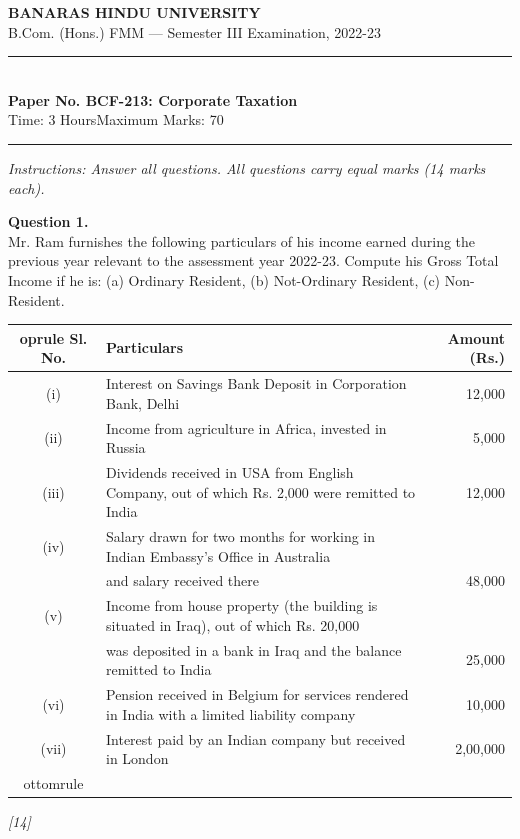 \documentclass[11pt,a4paper]{article}
\newcommand{\pts}[1]{\hfill   \textit{[#1]}}
\begin{document}
\begin{center}
  {\large\bfseries BANARAS HINDU UNIVERSITY}\\[2pt]
  {\normalsize B.Com. (Hons.) FMM --- Semester III Examination, 2022-23}\\[6pt]
  \rule{0.8\linewidth}{0.5pt}\\[6pt]
  {\large\bfseries Paper No. BCF-213: Corporate Taxation}\\[4pt]
  {\normalsize Time: 3 Hours\hfill Maximum Marks: 70}
\end{center}

\rule{\linewidth}{0.4pt}

\smallskip



\noindent   \textit{Instructions: Answer all questions. All questions carry equal marks (14 marks each).}

\bigskip




\noindent   \textbf{Question 1.} \\
Mr. Ram furnishes the following particulars of his income earned during the previous year relevant to the assessment year 2022-23. Compute his Gross Total Income if he is: (a) Ordinary Resident, (b) Not-Ordinary Resident, (c) Non-Resident.


\begin{table}[h!]
  \centering
  \small
  
\begin{tabular}{clr}
     oprule
   \textbf{Sl. No.} &   \textbf{Particulars} &   \textbf{Amount (Rs.)} \\
    \midrule
    (i)   & Interest on Savings Bank Deposit in Corporation Bank, Delhi & 12,000 \\
    (ii)  & Income from agriculture in Africa, invested in Russia & 5,000 \\
    (iii) & Dividends received in USA from English Company, out of which Rs. 2,000 were remitted to India & 12,000 \\
    (iv)  & Salary drawn for two months for working in Indian Embassy's Office in Australia & \\
          & and salary received there & 48,000 \\
    (v)   & Income from house property (the building is situated in Iraq), out of which Rs. 20,000 & \\
          & was deposited in a bank in Iraq and the balance remitted to India & 25,000 \\
    (vi)  & Pension received in Belgium for services rendered in India with a limited liability company & 10,000 \\
    (vii) & Interest paid by an Indian company but received in London & 2,00,000 \\
    ottomrule
  \end{tabular}
\end{table}\pts{14}
\end{document}
